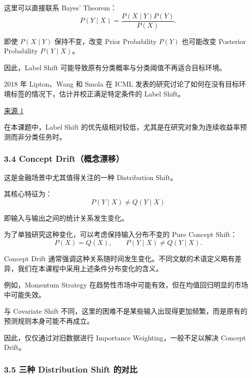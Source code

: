 这里可以直接联系 Bayes' Theorem：
\[P(Y\mid X)
=
\frac{P(X\mid Y)P(Y)}{P(X)}.\]

即使 \(P(X\mid Y)\) 保持不变，改变 Prior Probability \(P(Y)\) 也可能改变 Posterior Probability \(P(Y\mid X)\)。

因此，Label Shift 可能导致原有分类概率与分类阈值不再适合目标环境。

2018 年 Lipton、Wang 和 Smola 在 ICML 发表的研究讨论了如何在没有目标环境标签的情况下，估计并校正满足特定条件的 Label Shift。

\href{https://proceedings.mlr.press/v80/lipton18a}{来源 1}

在本课题中，Label Shift 的优先级相对较低，尤其是在研究对象为连续收益率预测而非分类任务时。

\hypertarget{part-2-23-0001-concept-driftux6982ux5ff5ux6f02ux79fb}{%
\subsubsection{3.4 Concept Drift（概念漂移）}\label{part-2-23-0001-concept-driftux6982ux5ff5ux6f02ux79fb}}

这是金融场景中尤其值得关注的一种 Distribution Shift。

其核心特征为：
\[\boxed{
P(Y\mid X)\neq Q(Y\mid X)
}\]

即输入与输出之间的统计关系发生变化。

为了单独研究这种变化，可以考虑保持输入分布不变的 Pure Concept Shift：
\[P(X)=Q(X),
\qquad
P(Y\mid X)\neq Q(Y\mid X).\]

Concept Drift 通常强调这种关系随时间发生变化。不同文献的术语定义略有差异，我们在本课程中采用上述条件分布变化的含义。


例如，Momentum Strategy 在趋势性市场中可能有效，但在均值回归明显的市场中可能失效。

与 Covariate Shift 不同，这里的困难不是某些输入出现得更加频繁，而是原有的预测规则本身可能不再成立。

因此，仅仅通过对旧数据进行 Importance Weighting，一般不足以解决 Concept Drift。

\hypertarget{part-2-23-0001-ux4e09ux79cd-distribution-shift-ux7684ux5bf9ux6bd4}{%
\subsubsection{3.5 三种 Distribution Shift 的对比}\label{part-2-23-0001-ux4e09ux79cd-distribution-shift-ux7684ux5bf9ux6bd4}}

